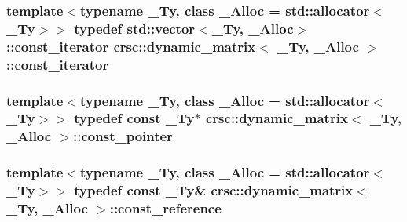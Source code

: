 \subsubsection[{\texorpdfstring{const\+\_\+iterator}{const_iterator}}]{\setlength{\rightskip}{0pt plus 5cm}template$<$typename \+\_\+\+Ty, class \+\_\+\+Alloc = std\+::allocator$<$\+\_\+\+Ty$>$$>$ typedef std\+::vector$<$\+\_\+\+Ty, \+\_\+\+Alloc$>$\+::{\bf const\+\_\+iterator} {\bf crsc\+::dynamic\+\_\+matrix}$<$ \+\_\+\+Ty, \+\_\+\+Alloc $>$\+::{\bf const\+\_\+iterator}}\hypertarget{classcrsc_1_1dynamic__matrix_a85960561507869e760b0b0f4be6964cf}{}\label{classcrsc_1_1dynamic__matrix_a85960561507869e760b0b0f4be6964cf}
\subsubsection[{\texorpdfstring{const\+\_\+pointer}{const_pointer}}]{\setlength{\rightskip}{0pt plus 5cm}template$<$typename \+\_\+\+Ty, class \+\_\+\+Alloc = std\+::allocator$<$\+\_\+\+Ty$>$$>$ typedef const \+\_\+\+Ty$\ast$ {\bf crsc\+::dynamic\+\_\+matrix}$<$ \+\_\+\+Ty, \+\_\+\+Alloc $>$\+::{\bf const\+\_\+pointer}}\hypertarget{classcrsc_1_1dynamic__matrix_ab72da9ca0ac66408077687988c31a781}{}\label{classcrsc_1_1dynamic__matrix_ab72da9ca0ac66408077687988c31a781}
\subsubsection[{\texorpdfstring{const\+\_\+reference}{const_reference}}]{\setlength{\rightskip}{0pt plus 5cm}template$<$typename \+\_\+\+Ty, class \+\_\+\+Alloc = std\+::allocator$<$\+\_\+\+Ty$>$$>$ typedef const \+\_\+\+Ty\& {\bf crsc\+::dynamic\+\_\+matrix}$<$ \+\_\+\+Ty, \+\_\+\+Alloc $>$\+::{\bf const\+\_\+reference}}\hypertarget{classcrsc_1_1dynamic__matrix_a93dd3386c16d60c4e8fb1e10b442fae0}{}\label{classcrsc_1_1dynamic__matrix_a93dd3386c16d60c4e8fb1e10b442fae0}
